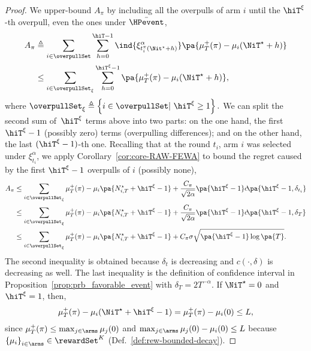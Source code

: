 \begin{proof}

We upper-bound $A_{\pi}$ by including all the overpulls of arm $i$ until the $\hiT^\xi$-th overpull, even the ones under $\bar{\HPevent}$,
\begin{align*}
A_{\pi} &\triangleq  \sum_{i\in \overpullSet}   \sum_{h=0}^{\hiT-1}  \ind{ \xi^\alpha_{t_i^{\pi}(\Nit^\star + h) }} \pa{\mu^+_T(\pi) - \mu_i(\NiT^{\star} + h)} \\
&
\leq \sum_{i\in \overpullSet_\xi}   \sum_{h=0}^{\hiT^\xi-1}  \pa{\mu^+_T(\pi) - \mu_i(\NiT^{\star} + h)},
\end{align*}
where $\overpullSet_\xi \triangleq \left\{ i \in \overpullSet | \  \hiT^\xi \geq 1 \right\}.$ We can split the second sum of~$\hiT^\xi$ terms above into two parts: on the one hand, the first $\hiT^\xi-1$ (possibly zero) terms (overpulling differences); and on the other hand, the last  $(\hiT^\xi-1)$-th one. Recalling that at the round $t_i$, arm $i$ was selected under $\xi^\alpha_{t_i}$, we apply
Corollary~\ref{cor:core-RAW-FEWA} to bound the regret caused by the first $\hiT^\xi-1$ overpulls of $i$ (possibly none),
\begin{align}
A_{\pi} &\leq  \sum_{i \in \overpullSet_\xi}   \mu^+_T(\pi) - \mu_i\pa{N_{i, T}^\star + \hiT^\xi  -1} + \frac{C_\pi}{\sqrt{2\alpha}}\pa{\hiT^\xi - 1}c\!\pa{\hiT^\xi-1, \delta_{t_i }} \label{eq:cor1-use1}\\
&\leq \sum_{i \in \overpullSet_\xi}   \mu^+_T(\pi) - \mu_i\pa{N_{i, T}^\star + \hiT^\xi  -1} + \frac{C_\pi}{\sqrt{2\alpha}}\pa{\hiT^\xi - 1}c\!\pa{\hiT^\xi-1, \delta_{T}}\\
&\leq \sum_{i \in \overpullSet_\xi}   \mu^+_T(\pi) - \mu_i\pa{N_{i, T}^\star + \hiT^\xi  -1} + C_\pi \sigma\sqrt{\pa{\hiT^\xi - 1}\log{\pa{T}}}.
\label{eq:lasttimepdq}
\end{align}
 The second inequality is obtained because $\delta_t$ is decreasing and $c(\cdot,\delta)$ is decreasing as well. The last inequality is the definition of confidence interval in Proposition~\ref{prop:prb_favorable_event} with $\delta_T = 2T^{-\alpha}$. 
 If  $\NiT^{\star} = 0$ and $\hiT^\xi = 1$, then,
\[ \mu^+_T(\pi) - \mu_i(\NiT^{\star} + \hiT^\xi - 1) =  \mu^+_T(\pi) - \mu_i(0) \leq L,\] 
since $\mu^+_T (\pi) \leq \max_{j\in\arms}\mu_j(0)$ and  $\max_{j\in\arms}\mu_j(0) - \mu_i(0) \leq L$ because $\left\{\mu_i\right\}_{i \in \arms} \in \rewardSet^K$ (Def.~\ref{def:rew-bounded-decay}). 


\end{proof}
